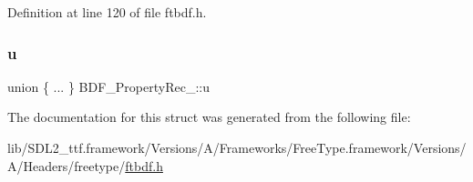 Definition at line 120 of file ftbdf.\+h.

\mbox{\label{struct_b_d_f___property_rec___aa9ff7a27d6fbd9e8045e6cc10f736dfe}} 
\subsubsection{\texorpdfstring{u}{u}}
{\footnotesize\ttfamily union \{ ... \}   B\+D\+F\+\_\+\+Property\+Rec\+\_\+\+::u}



The documentation for this struct was generated from the following file\+:\begin{DoxyCompactItemize}
\item 
lib/\+S\+D\+L2\+\_\+ttf.\+framework/\+Versions/\+A/\+Frameworks/\+Free\+Type.\+framework/\+Versions/\+A/\+Headers/freetype/\mbox{\hyperlink{ftbdf_8h}{ftbdf.\+h}}\end{DoxyCompactItemize}
